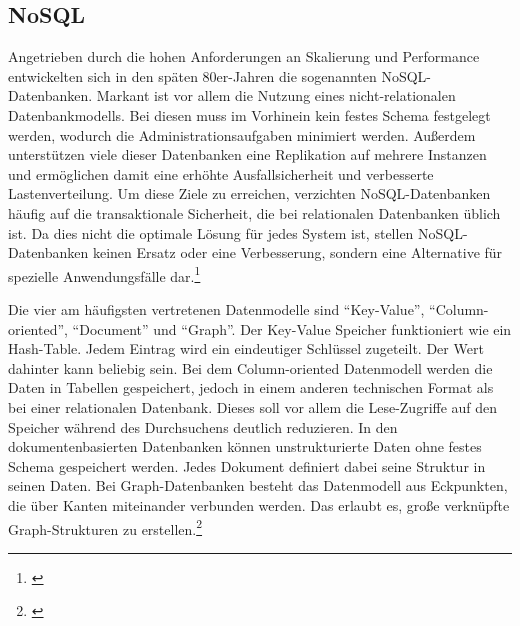 
\subsection{NoSQL}


Angetrieben durch die hohen Anforderungen an Skalierung und Performance entwickelten sich in den späten 80er-Jahren die sogenannten NoSQL-Datenbanken. Markant ist vor allem die Nutzung eines nicht-relationalen Datenbankmodells. Bei diesen muss im Vorhinein kein festes Schema festgelegt werden, wodurch die Administrationsaufgaben minimiert werden. Außerdem unterstützen viele dieser Datenbanken eine Replikation auf mehrere Instanzen und ermöglichen damit eine erhöhte Ausfallsicherheit und verbesserte Lastenverteilung. Um diese Ziele zu erreichen, verzichten NoSQL-Datenbanken häufig auf die transaktionale Sicherheit, die bei relationalen Datenbanken üblich ist. Da dies nicht die optimale Lösung für jedes System ist, stellen NoSQL-Datenbanken keinen Ersatz oder eine Verbesserung, sondern eine Alternative für spezielle Anwendungsfälle dar.\footnote{\cite[Vgl.][51\psq]{Bagga2021}}

Die vier am häufigsten vertretenen Datenmodelle sind \enquote{Key-Value}, \enquote{Column-oriented}, \enquote{Document} und \enquote{Graph}. Der Key-Value Speicher funktioniert wie ein Hash-Table. Jedem Eintrag wird ein eindeutiger Schlüssel zugeteilt. Der Wert dahinter kann beliebig sein. Bei dem Column-oriented Datenmodell werden die Daten in Tabellen gespeichert, jedoch in einem anderen technischen Format als bei einer relationalen Datenbank. Dieses soll vor allem die Lese-Zugriffe auf den Speicher während des Durchsuchens deutlich reduzieren. In den dokumentenbasierten Datenbanken können unstrukturierte Daten ohne festes Schema gespeichert werden. Jedes Dokument definiert dabei seine Struktur in seinen Daten. Bei Graph-Datenbanken besteht das Datenmodell aus Eckpunkten, die über Kanten miteinander verbunden werden. Das erlaubt es, große verknüpfte Graph-Strukturen zu erstellen.\footnote{\cite[Vgl.][52\psq]{Bagga2021}}

